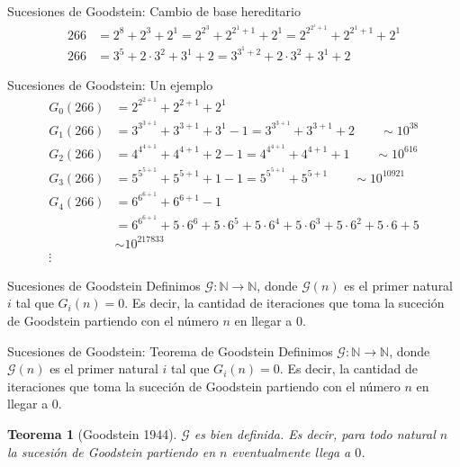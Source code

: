 \documentclass[10pt]{beamer}
\newcommand{\matN}{\mathbb{N}}
\newtheorem{teo}{Teorema}[section]
\begin{document}
\begin{frame}{Sucesiones de Goodstein: Cambio de base hereditario}
  \begin{align*}
    266 &= 2^8 + 2^3 + 2^1 = 2^{2^3} + 2^{2^1 + 1} + 2^{1} = 2^{2^{2^1 + 1}} + 2^{2^1 + 1} + 2^{1}\\
    266 &= 3^5 + 2\cdot 3^2 + 3^1 + 2 = 3^{3^1 + 2} + 2\cdot 3^2 + 3^1 + 2
  \end{align*}
\end{frame}


\begin{frame}{Sucesiones de Goodstein: Un ejemplo}
  \begin{align*}
    G_0(266) &= 2^{2^{2 + 1}} + 2^{2 + 1} + 2^{1}\\
    G_1(266) &= 3^{3^{3 + 1}} + 3^{3 + 1} + 3^{1} -1 = 3^{3^{3 + 1}} + 3^{3 + 1} + 2 \qquad \sim 10^{38}\\
    G_2(266) &= 4^{4^{4 + 1}} + 4^{4 + 1} + 2 -1 =  4^{4^{4 + 1}} + 4^{4 + 1} + 1 \qquad \sim 10^{616}\\
    G_3(266) &= 5^{5^{5 + 1}} + 5^{5 + 1} + 1 - 1 = 5^{5^{5 + 1}} + 5^{5 + 1} \qquad \sim 10^{10921}\\
    G_4(266) &=  6^{6^{6 + 1}} + 6^{6 + 1} - 1 \\
             &= 6^{6^{6 + 1}} + 5\cdot {6^6} + 5\cdot {6^5} + 5\cdot {6^4} + 5\cdot 6^3 + 5\cdot 6^2 + 5\cdot 6 + 5\\
             &\sim 10^{217833}\\
    \vdots
  \end{align*}
\end{frame}


\begin{frame}{Sucesiones de Goodstein}
  Definimos $ \mathcal{G} : \matN \to \matN $, donde $\mathcal{G}(n)$ es el primer
  natural $i$ tal que $G_i(n) = 0$. Es decir, la cantidad de iteraciones que toma la suceción
  de Goodstein partiendo con el número $n$ en llegar a $0$.
\end{frame}

\begin{frame}{Sucesiones de Goodstein: Teorema de Goodstein}
  Definimos $ \mathcal{G} : \matN \to \matN $, donde $\mathcal{G}(n)$ es el primer
  natural $i$ tal que $G_i(n) = 0$. Es decir, la cantidad de iteraciones que toma la suceción
  de Goodstein partiendo con el número $n$ en llegar a $0$.
  \begin{teo}[Goodstein 1944]
    $\mathcal{G}$ es bien definida.  Es decir, para todo natural $n$
    la sucesión de Goodstein partiendo en $n$ eventualmente llega a $0$.
  \end{teo}
\end{frame}
\end{document}
